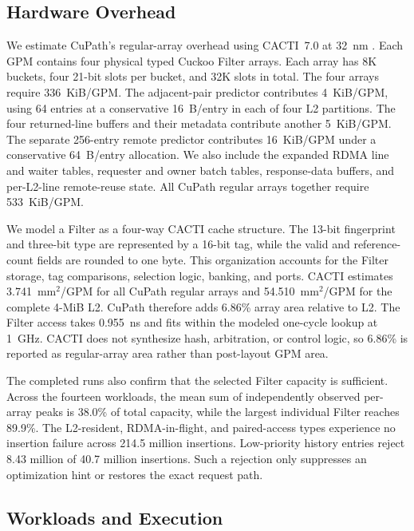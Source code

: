 \subsection{Hardware Overhead}

We estimate CuPath's regular-array overhead using CACTI~7.0 at 32~nm
\cite{balasubramonian2017cacti}. Each GPM contains four physical typed Cuckoo
Filter arrays. Each array has 8K buckets, four 21-bit slots per bucket, and
32K slots in total. The four arrays require 336~KiB/GPM. The adjacent-pair
predictor contributes 4~KiB/GPM, using 64 entries at a conservative
16~B/entry in each of four L2 partitions. The four returned-line buffers and
their metadata contribute another 5~KiB/GPM. The separate 256-entry remote
predictor contributes 16~KiB/GPM under a conservative 64~B/entry allocation.
We also include the expanded RDMA line and waiter tables, requester and owner
batch tables, response-data buffers, and per-L2-line remote-reuse state. All
CuPath regular arrays together require 533~KiB/GPM.

We model a Filter as a four-way CACTI cache structure. The 13-bit fingerprint
and three-bit type are represented by a 16-bit tag, while the valid and
reference-count fields are rounded to one byte. This organization accounts
for the Filter storage, tag comparisons, selection logic, banking, and ports.
CACTI estimates 3.741~mm$^2$/GPM for all CuPath regular arrays and
54.510~mm$^2$/GPM for the complete 4-MiB L2. CuPath therefore adds 6.86\%
array area relative to L2. The Filter access takes 0.955~ns and fits within
the modeled one-cycle lookup at 1~GHz. CACTI does not synthesize hash,
arbitration, or control logic, so 6.86\% is reported as regular-array area
rather than post-layout GPM area.

The completed runs also confirm that the selected Filter capacity is
sufficient. Across the fourteen workloads, the mean sum of independently
observed per-array peaks is 38.0\% of total capacity, while the largest
individual Filter reaches 89.9\%. The L2-resident, RDMA-in-flight, and
paired-access types experience no insertion failure across 214.5 million
insertions. Low-priority history entries reject 8.43 million of 40.7 million
insertions. Such a rejection only suppresses an optimization hint or restores
the exact request path.

\subsection{Workloads and Execution}

